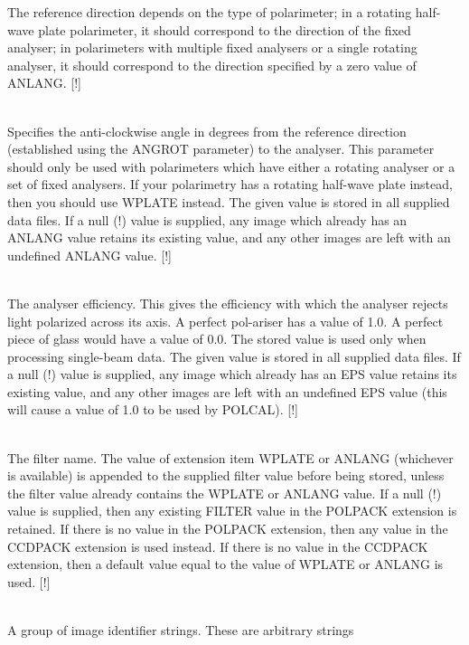 \documentclass[twoside,11pt]{article}
\newcommand{\htmlref}[2]{#1}
\renewcommand{\_}{\texttt{\symbol{95}}}
\newcommand{\sstsubsection}[1]{ \item[{#1}] \mbox{} \\}
\newcommand{\sstsubsection}[1]{\item[{#1}]}
\begin{document}
{{{         The reference direction depends on the type of polarimeter; in a
         rotating half-wave plate polarimeter, it should correspond to the
         direction of the fixed analyser; in polarimeters with multiple
         fixed analysers or a single rotating analyser, it should
         correspond to the direction specified by a zero value of ANLANG. [!]
      }
      \sstsubsection{
         ANLANG = \_REAL (Read)
      }{
         Specifies the anti-clockwise angle in degrees from the reference
         direction (established using the ANGROT parameter) to the
         analyser. This parameter should only be used with polarimeters
         which have either a rotating analyser or a set of fixed
         analysers. If your polarimetry has a rotating half-wave plate
         instead, then you should use WPLATE instead. The given value is
         stored in all supplied data files. If a null (!) value is
         supplied, any image which already has an ANLANG value retains its
         existing value, and any other images are left with an undefined
         ANLANG value. [!]
      }
      \sstsubsection{
         EPS = \_REAL (Read)
      }{
         The analyser efficiency. This gives the efficiency with which the
         analyser rejects light polarized across its axis. A perfect
         pol-ariser has a value of 1.0. A perfect piece of glass would have
         a value of 0.0. The stored value is used only when processing
         single-beam data. The given value is stored in all supplied data
         files. If a null (!) value is supplied, any image which already
         has an EPS value retains its existing value, and any other images
         are left with an undefined EPS value (this will cause a value of
         1.0 to be used by \htmlref{POLCAL}{POLCAL}). [!]
      }
      \sstsubsection{
         FILTER = LITERAL (Read)
      }{
         The filter name. The value of extension item WPLATE or ANLANG
         (whichever is available) is appended to the supplied filter value
         before being stored, unless the filter value already contains the
         WPLATE or ANLANG value. If a null (!) value is supplied, then
         any existing FILTER value in the POLPACK extension is retained. If
         there is no value in the POLPACK extension, then any value in the
         CCDPACK extension is used instead. If there is no value in the
         CCDPACK extension, then a default value equal to the value of WPLATE
         or ANLANG is used. [!]
      }
      \sstsubsection{
         IMGID = LITERAL (Read)
      }{
         A group of image identifier strings. These are arbitrary strings
}}}
\end{document}
